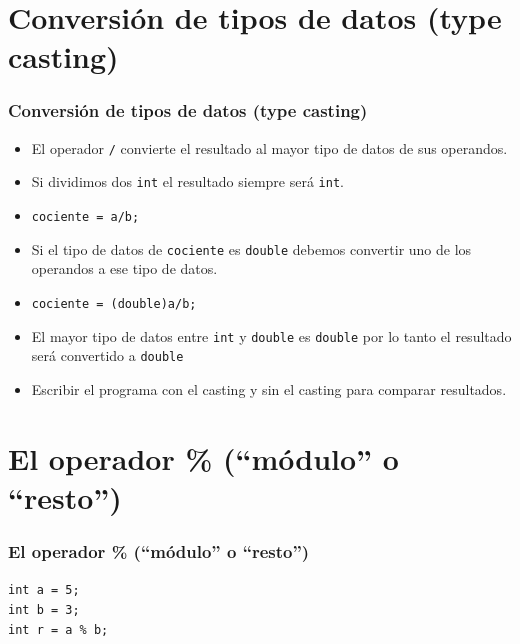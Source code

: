 \documentclass[handout]{beamer}
\begin{document}
\section{Conversión de tipos de datos (type casting)} %
\label{sec:conversion_de_tipos_de_datos}
\begin{frame}[t]\frametitle{Conversión de tipos de datos (type casting)}
  \begin{itemize}
    \item El operador \texttt{/} convierte el resultado al mayor tipo de datos de sus operandos.
    \item Si dividimos dos \texttt{int} el resultado siempre será \texttt{int}.
    \item \texttt{cociente = a/b;}
    \item Si el tipo de datos de \texttt{cociente} es \texttt{double} debemos convertir uno de los operandos a ese tipo de datos.
    \item \texttt{cociente = (double)a/b;}
    \item El mayor tipo de datos entre \texttt{int} y \texttt{double} es \texttt{double} por lo tanto el resultado será convertido a \texttt{double}
    \item Escribir el programa con el casting y sin el casting para comparar resultados.
  \end{itemize}
  
\end{frame}

\section{El operador \% (``módulo'' o ``resto'')} %
\label{sec:el_operador__modulo_o_resto_}
\begin{frame}[t]\frametitle{El operador \% (``módulo'' o ``resto'')}
    
\texttt{int a = 5;}\\
\texttt{int b = 3;} \\
\texttt{int r = a \% b;}


\end{frame}
\end{document}

